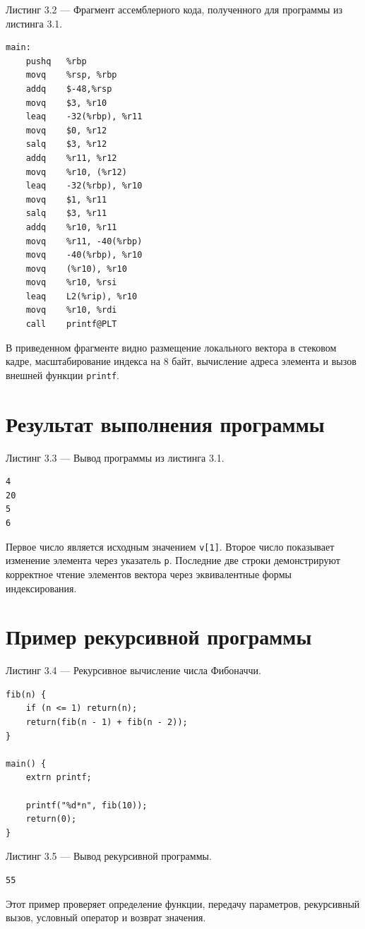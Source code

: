 Листинг 3.2 --- Фрагмент ассемблерного кода, полученного для программы из листинга 3.1.
\begin{verbatim}
main:
    pushq   %rbp
    movq    %rsp, %rbp
    addq    $-48,%rsp
    movq    $3, %r10
    leaq    -32(%rbp), %r11
    movq    $0, %r12
    salq    $3, %r12
    addq    %r11, %r12
    movq    %r10, (%r12)
    leaq    -32(%rbp), %r10
    movq    $1, %r11
    salq    $3, %r11
    addq    %r10, %r11
    movq    %r11, -40(%rbp)
    movq    -40(%rbp), %r10
    movq    (%r10), %r10
    movq    %r10, %rsi
    leaq    L2(%rip), %r10
    movq    %r10, %rdi
    call    printf@PLT
\end{verbatim}

В приведенном фрагменте видно размещение локального вектора в стековом кадре, масштабирование индекса на 8 байт, вычисление адреса элемента и вызов внешней функции \texttt{printf}.

\section{Результат выполнения программы}

Листинг 3.3 --- Вывод программы из листинга 3.1.
\begin{verbatim}
4
20
5
6
\end{verbatim}

Первое число является исходным значением \texttt{v[1]}. Второе число показывает изменение элемента через указатель \texttt{p}. Последние две строки демонстрируют корректное чтение элементов вектора через эквивалентные формы индексирования.

\section{Пример рекурсивной программы}

Листинг 3.4 --- Рекурсивное вычисление числа Фибоначчи.
\begin{verbatim}
fib(n) {
    if (n <= 1) return(n);
    return(fib(n - 1) + fib(n - 2));
}

main() {
    extrn printf;

    printf("%d*n", fib(10));
    return(0);
}
\end{verbatim}

Листинг 3.5 --- Вывод рекурсивной программы.
\begin{verbatim}
55
\end{verbatim}

Этот пример проверяет определение функции, передачу параметров, рекурсивный вызов, условный оператор и возврат значения.

